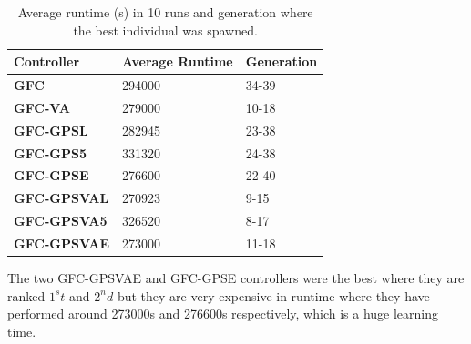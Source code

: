\documentclass[10pt,journal,compsoc]{IEEEtran}
\begin{document}
\begin{table}[!ht]
	\centering
	{\scriptsize
          \caption{Average runtime (s) in 10 runs
            and
                  generation where the best individual was spawned.}
		\label{tab:time}
		\begin{tabular}{|p{2.85cm}|p{2cm}|p{1.65cm}|}
			\hline  
			Controller& \textbf{Average Runtime}&\textbf{Generation}\\
                  \hline
                  			\hline 	 \textbf{\textbf{{\sf GFC}}} \cite{salem_cig2018}&294000
                   &34-39\\
\textbf{{\sf GFC-VA}} \cite{DBLP:conf/cig/SalemMG19}&279000
			 	&10-18\\	
 \textbf{{\sf GFC-GPSL}} \cite{DBLP:conf/cig/SalemMG19}& 282945
			 &23-38\\	
 \textbf{{\sf GFC-GPS5}} \cite{DBLP:conf/cig/SalemMG19}&331320
				&24-38\\	
 \textbf{{\sf GFC-GPSE}}&	276600
			 &22-40\\	
 \textbf{{\sf GFC-GPSVAL}} \cite{DBLP:conf/cig/SalemMG19}& 270923
				&9-15\\	
\textbf{{\sf GFC-GPSVA5}} \cite{DBLP:conf/cig/SalemMG19}&	326520
			 &8-17\\	
\textbf{{\sf GFC-GPSVAE}}& 273000
				&11-18\\					
			\hline 
		\end{tabular}
		
	}
\end{table} 

The two {\sf GFC-GPSVAE} and {\sf GFC-GPSE} controllers were the best where
they are ranked $1^st$ and $2^nd$ but they are very expensive in runtime
where they have performed around 273000s and 276600s respectively, which is a
huge learning time. %
                    
                 
\end{document}
